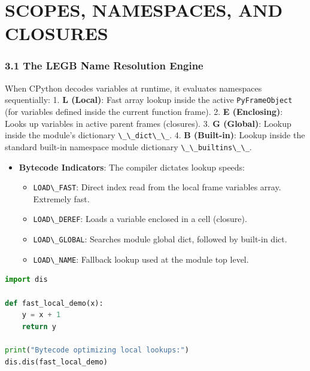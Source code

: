 \hypertarget{scopes-namespaces-and-closures}{%
\chapter{SCOPES, NAMESPACES, AND
CLOSURES}\label{scopes-namespaces-and-closures}}

\hypertarget{the-legb-name-resolution-engine}{%
\subsection{3.1 The LEGB Name Resolution
Engine}\label{the-legb-name-resolution-engine}}

When CPython decodes variables at runtime, it evaluates namespaces
sequentially: 1. \textbf{L (Local)}: Fast array lookup inside the active
\passthrough{\lstinline!PyFrameObject!} (for variables defined inside
the current function frame). 2. \textbf{E (Enclosing)}: Looks up
variables in active parent frames (closures). 3. \textbf{G (Global)}:
Lookup inside the module's dictionary
\passthrough{\lstinline!\_\_dict\_\_!}. 4. \textbf{B (Built-in)}: Lookup
inside the standard built-in namespace module dictionary
\passthrough{\lstinline!\_\_builtins\_\_!}.

\begin{itemize}
\tightlist
\item
  \textbf{Bytecode Indicators}: The compiler dictates lookup speeds:

  \begin{itemize}
  \tightlist
  \item
    \passthrough{\lstinline!LOAD\_FAST!}: Direct index read from the
    local frame variables array. Extremely fast.
  \item
    \passthrough{\lstinline!LOAD\_DEREF!}: Loads a variable enclosed in
    a cell (closure).
  \item
    \passthrough{\lstinline!LOAD\_GLOBAL!}: Searches module global dict,
    followed by built-in dict.
  \item
    \passthrough{\lstinline!LOAD\_NAME!}: Fallback lookup used at the
    module top level.
  \end{itemize}
\end{itemize}

\begin{lstlisting}[language=Python]
import dis

def fast_local_demo(x):
    y = x + 1
    return y

print("Bytecode optimizing local lookups:")
dis.dis(fast_local_demo)
\end{lstlisting}

